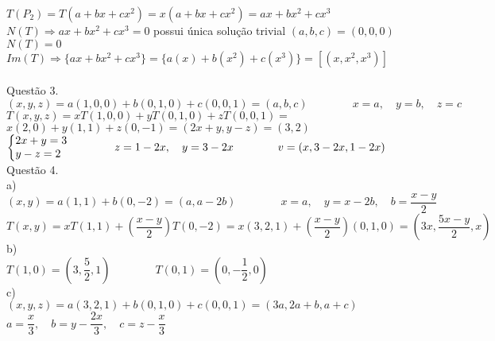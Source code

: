 \documentclass[12pt]{article}
\begin{document}
$T(P_{2})=T(a+bx+cx^{2})=x(a+bx+cx^{2})=ax+bx^{2}+cx^{3}$\\

$N(T)\Longrightarrow ax+bx^{2}+cx^{3}=0$ possui única solução trivial $(a,b,c)=(0,0,0)$\qquad $N(T)=0$\\

$Im(T)\Longrightarrow \lbrace ax+bx^{2}+cx^{3}\rbrace=\lbrace a(x)+b(x^{2})+c(x^{3})\rbrace=[(x,x^{2},x^{3})]$\\
	
\\

\noindent Questão 3.\\

$(x,y,z)=a(1,0,0)+b(0,1,0)+c(0,0,1)=(a,b,c)\qquad\qquad x=a,\quad y=b,\quad z=c$\\

$T(x,y,z)=xT(1,0,0)+yT(0,1,0)+zT(0,0,1)=$\\

$x(2,0)+y(1,1)+z(0,-1)=(2x+y,y-z)=(3,2)$\\

$\left\{\begin{array}{@{}l@{}}2x+y=3\\y-z=2\end{array}\right.\qquad\qquad z=1-2x,\quad y=3-2x\qquad\qquad v=(x, 3-2x, 1-2x)$\\

\noindent Questão 4.\\

\noindent a)\\

$(x,y)=a(1,1)+b(0,-2)=(a,a-2b)\qquad\qquad x=a,\quad y=x-2b,\quad b = \dfrac{x-y}{2}$\\

$T(x,y)=xT(1,1)+(\dfrac{x-y}{2})T(0,-2)=x(3,2,1)+(\dfrac{x-y}{2})(0,1,0)=(3x,\dfrac{5x-y}{2},x)$\\

\noindent b)\\
	
$T(1,0)=\left(3,\dfrac{5}{2},1\right)\qquad\qquad T(0,1)=\left(0,-\dfrac{1}{2},0\right)$\\

\noindent c)\\

$(x,y,z)=a(3,2,1)+b(0,1,0)+c(0,0,1)=(3a,2a+b,a+c)$\\

$a=\dfrac{x}{3},\quad b=y-\dfrac{2x}{3},\quad c=z-\dfrac{x}{3}$\\
\end{document}

